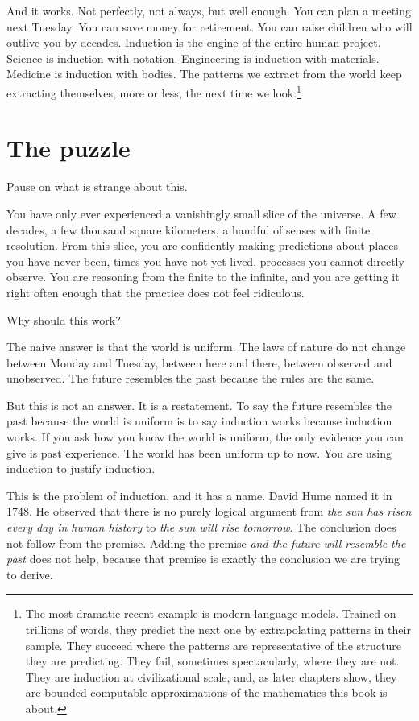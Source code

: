 And it works. Not perfectly, not always, but well enough. You can plan a meeting next Tuesday. You can save money for retirement. You can raise children who will outlive you by decades. Induction is the engine of the entire human project. Science is induction with notation. Engineering is induction with materials. Medicine is induction with bodies. The patterns we extract from the world keep extracting themselves, more or less, the next time we look.\footnote{The most dramatic recent example is modern language models. Trained on trillions of words, they predict the next one by extrapolating patterns in their sample. They succeed where the patterns are representative of the structure they are predicting. They fail, sometimes spectacularly, where they are not. They are induction at civilizational scale, and, as later chapters show, they are bounded computable approximations of the mathematics this book is about.}

\section*{The puzzle}

Pause on what is strange about this.

You have only ever experienced a vanishingly small slice of the universe. A few decades, a few thousand square kilometers, a handful of senses with finite resolution. From this slice, you are confidently making predictions about places you have never been, times you have not yet lived, processes you cannot directly observe. You are reasoning from the finite to the infinite, and you are getting it right often enough that the practice does not feel ridiculous.

Why should this work?

The naive answer is that the world is uniform. The laws of nature do not change between Monday and Tuesday, between here and there, between observed and unobserved. The future resembles the past because the rules are the same.

But this is not an answer. It is a restatement. To say the future resembles the past because the world is uniform is to say induction works because induction works. If you ask how you know the world is uniform, the only evidence you can give is past experience. The world has been uniform up to now. You are using induction to justify induction.

This is the problem of induction, and it has a name. David Hume named it in 1748. He observed that there is no purely logical argument from \emph{the sun has risen every day in human history} to \emph{the sun will rise tomorrow}. The conclusion does not follow from the premise. Adding the premise \emph{and the future will resemble the past} does not help, because that premise is exactly the conclusion we are trying to derive.

